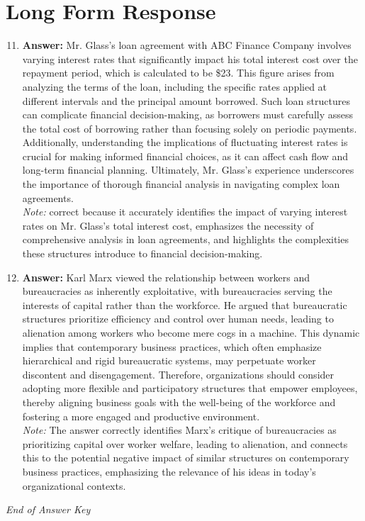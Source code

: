 \documentclass[12pt]{article}
\begin{document}
\section*{Long Form Response}
\begin{enumerate}[label=\arabic*.]
\setcounter{enumi}{10}
\item \textbf{Answer:} Mr. Glass's loan agreement with ABC Finance Company involves varying interest rates that significantly impact his total interest cost over the repayment period, which is calculated to be \$23. This figure arises from analyzing the terms of the loan, including the specific rates applied at different intervals and the principal amount borrowed. Such loan structures can complicate financial decision-making, as borrowers must carefully assess the total cost of borrowing rather than focusing solely on periodic payments. Additionally, understanding the implications of fluctuating interest rates is crucial for making informed financial choices, as it can affect cash flow and long-term financial planning. Ultimately, Mr. Glass's experience underscores the importance of thorough financial analysis in navigating complex loan agreements.
\\ \textit{Note:} correct because it accurately identifies the impact of varying interest rates on Mr. Glass's total interest cost, emphasizes the necessity of comprehensive analysis in loan agreements, and highlights the complexities these structures introduce to financial decision-making.
\item \textbf{Answer:} Karl Marx viewed the relationship between workers and bureaucracies as inherently exploitative, with bureaucracies serving the interests of capital rather than the workforce. He argued that bureaucratic structures prioritize efficiency and control over human needs, leading to alienation among workers who become mere cogs in a machine. This dynamic implies that contemporary business practices, which often emphasize hierarchical and rigid bureaucratic systems, may perpetuate worker discontent and disengagement. Therefore, organizations should consider adopting more flexible and participatory structures that empower employees, thereby aligning business goals with the well-being of the workforce and fostering a more engaged and productive environment.
\\ \textit{Note:} The answer correctly identifies Marx's critique of bureaucracies as prioritizing capital over worker welfare, leading to alienation, and connects this to the potential negative impact of similar structures on contemporary business practices, emphasizing the relevance of his ideas in today's organizational contexts.
\end{enumerate}

\vfill
\noindent\textit{End of Answer Key}
\end{document}
